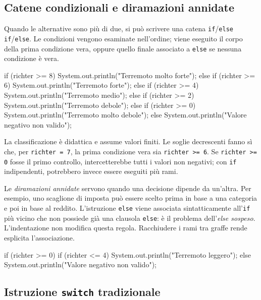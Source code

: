 \subsection{Catene condizionali e diramazioni annidate}
\label{sec:fi-java-cicli-if-catene}

Quando le alternative sono più di due, si può scrivere una catena
\texttt{if}/\texttt{else if}/\texttt{else}. Le condizioni vengono
esaminate nell'ordine; viene eseguito il corpo della prima condizione
vera, oppure quello finale associato a \texttt{else} se nessuna
condizione è vera.

\begin{unipdcode}[language=Java]
if (richter >= 8) {
    System.out.println("Terremoto molto forte");
} else if (richter >= 6) {
    System.out.println("Terremoto forte");
} else if (richter >= 4) {
    System.out.println("Terremoto medio");
} else if (richter >= 2) {
    System.out.println("Terremoto debole");
} else if (richter >= 0) {
    System.out.println("Terremoto molto debole");
} else {
    System.out.println("Valore negativo non valido");
}
\end{unipdcode}

La classificazione è didattica e assume valori finiti.
Le soglie decrescenti fanno sì che, per \texttt{richter = 7},
la prima condizione vera sia \texttt{richter >= 6}.
Se \texttt{richter >= 0} fosse il primo controllo, intercetterebbe
tutti i valori non negativi; con \texttt{if} indipendenti,
potrebbero invece essere eseguiti più rami.

Le \emph{diramazioni annidate} servono quando una decisione dipende
da un'altra. Per esempio, uno scaglione di imposta può essere scelto
prima in base a una categoria e poi in base al reddito. L'istruzione
\texttt{else} viene associata sintatticamente all'\texttt{if} più
vicino che non possiede già una clausola \texttt{else}: è il problema
dell'\emph{else sospeso}. L'indentazione non modifica questa regola.
Racchiudere i rami tra graffe rende esplicita l'associazione.

\begin{unipdcode}[language=Java]
if (richter >= 0) {
    if (richter <= 4) {
        System.out.println("Terremoto leggero");
    }
} else {
    System.out.println("Valore negativo non valido");
}
\end{unipdcode}

\clearpage

\subsection{Istruzione \texttt{switch} tradizionale}
\label{sec:fi-java-cicli-switch}

